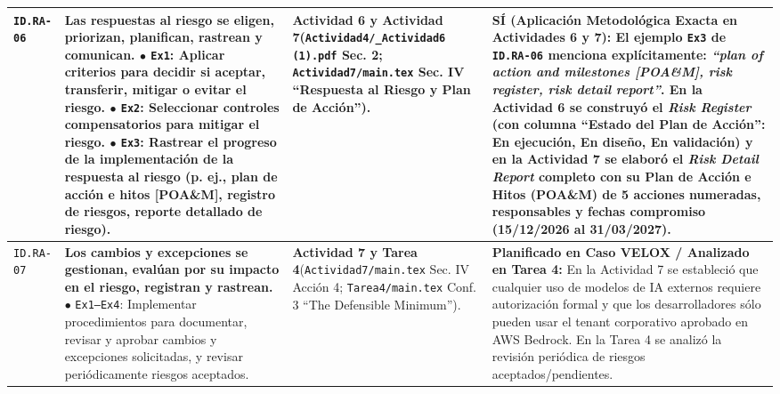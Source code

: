\documentclass[letterpaper,11pt]{article}
\begin{document}
\begin{longtable}{|C{1.5cm}|L{5.3cm}|L{4.3cm}|L{5.8cm}|}
\texttt{ID.RA-06} &
\textbf{Las respuestas al riesgo se eligen, priorizan, planifican, rastrean y comunican.}\newline
$\bullet$ \texttt{Ex1}: Aplicar criterios para decidir si aceptar, transferir, mitigar o evitar el riesgo.\newline
$\bullet$ \texttt{Ex2}: Seleccionar controles compensatorios para mitigar el riesgo.\newline
$\bullet$ \texttt{Ex3}: \textbf{Rastrear el progreso de la implementación de la respuesta al riesgo (p. ej., plan de acción e hitos [POA\&M], registro de riesgos, reporte detallado de riesgo)}. &
\textbf{Actividad 6 y Actividad 7}\newline (\texttt{Actividad4/\_Actividad6 (1).pdf} Sec. 2; \texttt{Actividad7/main.tex} Sec. IV ``Respuesta al Riesgo y Plan de Acción''). &
\textbf{SÍ (Aplicación Metodológica Exacta en Actividades 6 y 7):}\newline
El ejemplo \texttt{Ex3} de \texttt{ID.RA-06} menciona explícitamente: \textit{``plan of action and milestones [POA\&M], risk register, risk detail report''}. En la \textbf{Actividad 6} se construyó el \textit{Risk Register} (con columna ``Estado del Plan de Acción'': En ejecución, En diseño, En validación) y en la \textbf{Actividad 7} se elaboró el \textit{Risk Detail Report} completo con su \textbf{Plan de Acción e Hitos (POA\&M)} de 5 acciones numeradas, responsables y fechas compromiso (15/12/2026 al 31/03/2027). \\
\hline

\texttt{ID.RA-07} &
\textbf{Los cambios y excepciones se gestionan, evalúan por su impacto en el riesgo, registran y rastrean.}\newline
$\bullet$ \texttt{Ex1--Ex4}: Implementar procedimientos para documentar, revisar y aprobar cambios y excepciones solicitadas, y revisar periódicamente riesgos aceptados. &
\textbf{Actividad 7 y Tarea 4}\newline (\texttt{Actividad7/main.tex} Sec. IV Acción 4; \texttt{Tarea4/main.tex} Conf. 3 ``The Defensible Minimum''). &
\textbf{Planificado en Caso VELOX / Analizado en Tarea 4:}\newline
En la Actividad 7 se estableció que cualquier uso de modelos de IA externos requiere autorización formal y que los desarrolladores sólo pueden usar el tenant corporativo aprobado en AWS Bedrock. En la Tarea 4 se analizó la revisión periódica de riesgos aceptados/pendientes. \\
\hline


\end{longtable}
\end{document}
